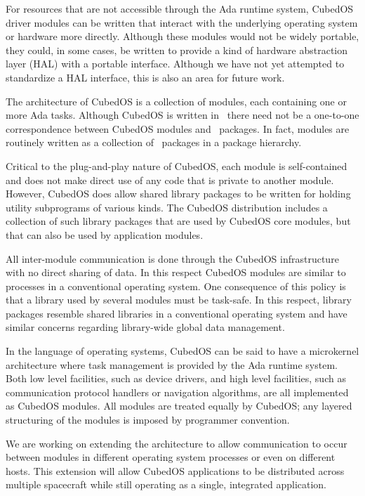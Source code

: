 For resources that are not accessible through the Ada runtime system, CubedOS driver modules can
be written that interact with the underlying operating system or hardware more directly.
Although these modules would not be widely portable, they could, in some cases, be written to
provide a kind of hardware abstraction layer (HAL) with a portable interface. Although we have
not yet attempted to standardize a HAL interface, this is also an area for future work.

The architecture of CubedOS is a collection of modules, each containing one or more Ada tasks.
Although CubedOS is written in \SPARK\ there need not be a one-to-one correspondence between
CubedOS modules and \SPARK\ packages. In fact, modules are routinely written as a collection of
\SPARK\ packages in a package hierarchy. 

Critical to the plug-and-play nature of CubedOS, each module is self-contained and does not make
direct use of any code that is private to another module. However, CubedOS does allow shared
library packages to be written for holding utility subprograms of various kinds. The CubedOS
distribution includes a collection of such library packages that are used by CubedOS core
modules, but that can also be used by application modules. 

All inter-module communication is done through the CubedOS infrastructure with no direct sharing
of data. In this respect CubedOS modules are similar to processes in a conventional operating
system. One consequence of this policy is that a library used by several modules must be
task-safe. In this respect, library packages resemble shared libraries in a conventional
operating system and have similar concerns regarding library-wide global data management.

In the language of operating systems, CubedOS can be said to have a microkernel architecture
where task management is provided by the Ada runtime system. Both low level facilities, such as
device drivers, and high level facilities, such as communication protocol handlers or navigation
algorithms, are all implemented as CubedOS modules. All modules are treated equally by CubedOS;
any layered structuring of the modules is imposed by programmer convention.

We are working on extending the architecture to allow communication to occur between modules in
different operating system processes or even on different hosts. This extension will allow
CubedOS applications to be distributed across multiple spacecraft while still operating as a
single, integrated application. 

